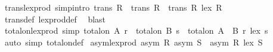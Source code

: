 \begin{isabellebody}
\begin{isamarkuptext}
\end{isamarkuptext}\isamarkuptrue%
\isamarkupfalse%
\ trans{\isacharunderscore}{\kern0pt}lex{\isacharunderscore}{\kern0pt}prod\ {\isacharbrackleft}{\kern0pt}simp{\isacharcomma}{\kern0pt}intro{\isacharbang}{\kern0pt}{\isacharbrackright}{\kern0pt}{\isacharcolon}{\kern0pt}\ {\isachardoublequoteopen}trans\ R{}\ {\isasymLongrightarrow}\ trans\ R{}\ {\isasymLongrightarrow}\ trans\ {\isacharparenleft}{\kern0pt}R{}\ {\isacharless}{\kern0pt}{\isacharasterisk}{\kern0pt}lex{\isacharasterisk}{\kern0pt}{\isachargreater}{\kern0pt}\ R{}{\isacharparenright}{\kern0pt}{\isachardoublequoteclose}\isanewline
%
\isadelimproof
\ \ %
\endisadelimproof
%
\isatagproof
{}\isamarkupfalse%
\ trans{\isacharunderscore}{\kern0pt}def\ lex{\isacharunderscore}{\kern0pt}prod{\isacharunderscore}{\kern0pt}def\ \isamarkupfalse%
\ blast%
\endisatagproof
{\isafoldproof}%
%
\isadelimproof
\isanewline
%
\endisadelimproof
\isanewline
{}\isamarkupfalse%
\ total{\isacharunderscore}{\kern0pt}on{\isacharunderscore}{\kern0pt}lex{\isacharunderscore}{\kern0pt}prod\ {\isacharbrackleft}{\kern0pt}simp{\isacharbrackright}{\kern0pt}{\isacharcolon}{\kern0pt}\ {\isachardoublequoteopen}total{\isacharunderscore}{\kern0pt}on\ A\ r\ {\isasymLongrightarrow}\ total{\isacharunderscore}{\kern0pt}on\ B\ s\ {\isasymLongrightarrow}\ total{\isacharunderscore}{\kern0pt}on\ {\isacharparenleft}{\kern0pt}A\ {\isasymtimes}\ B{\isacharparenright}{\kern0pt}\ {\isacharparenleft}{\kern0pt}r\ {\isacharless}{\kern0pt}{\isacharasterisk}{\kern0pt}lex{\isacharasterisk}{\kern0pt}{\isachargreater}{\kern0pt}\ s{\isacharparenright}{\kern0pt}{\isachardoublequoteclose}\isanewline
%
\isadelimproof
\ \ %
\endisadelimproof
%
\isatagproof
{}\isamarkupfalse%
\ {\isacharparenleft}{\kern0pt}auto\ simp{\isacharcolon}{\kern0pt}\ total{\isacharunderscore}{\kern0pt}on{\isacharunderscore}{\kern0pt}def{\isacharparenright}{\kern0pt}%
\endisatagproof
{\isafoldproof}%
%
\isadelimproof
\isanewline
%
\endisadelimproof
\isanewline
{}\isamarkupfalse%
\ asym{\isacharunderscore}{\kern0pt}lex{\isacharunderscore}{\kern0pt}prod{\isacharcolon}{\kern0pt}\ {\isachardoublequoteopen}{\isasymlbrakk}asym\ R{\isacharsemicolon}{\kern0pt}\ asym\ S{\isasymrbrakk}\ {\isasymLongrightarrow}\ asym\ {\isacharparenleft}{\kern0pt}R\ {\isacharless}{\kern0pt}{\isacharasterisk}{\kern0pt}lex{\isacharasterisk}{\kern0pt}{\isachargreater}{\kern0pt}\ S{\isacharparenright}{\kern0pt}{\isachardoublequoteclose}\isanewline

\end{isabellebody}
